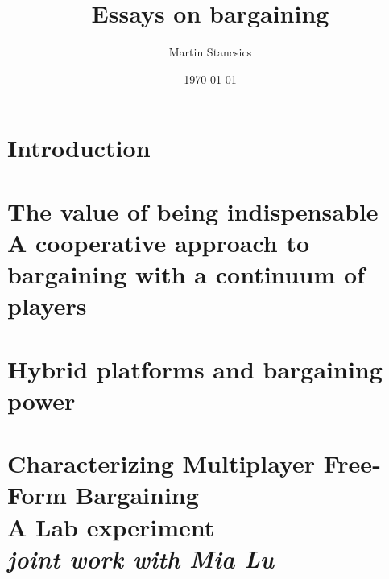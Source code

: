 \documentclass[a4paper]{report}
\title{Essays on bargaining}
\author{Martin Stancsics}
\date{\today}
\begin{document}




\tableofcontents
{}

\onehalfspacing

\chapter{Introduction}
\label{ch:introduction}
\setcounter{page}{1}



\chapter[The value of being indispensable]{%
    The value of being indispensable\\\vspace{0.4cm}%
    \large{A cooperative approach to bargaining with a continuum of players}%
}
\label{ch:theory}

\begin{subappendices}
    
\end{subappendices}

\chapter{Hybrid platforms and bargaining power}
\label{ch:application}

\begin{subappendices}
    
\end{subappendices}

\chapter[Characterizing Multiplayer Free-Form Bargaining]{%
    Characterizing Multiplayer Free-Form Bargaining\\\vspace{0.4cm}%
    \large{A Lab experiment}\\\vspace{0.2cm}%
    \large{\textit{joint work with Mia Lu}}%
}
\label{ch:experiment}

\begin{subappendices}
    
\end{subappendices}

\singlespacing

\printbibliography
\end{document}
